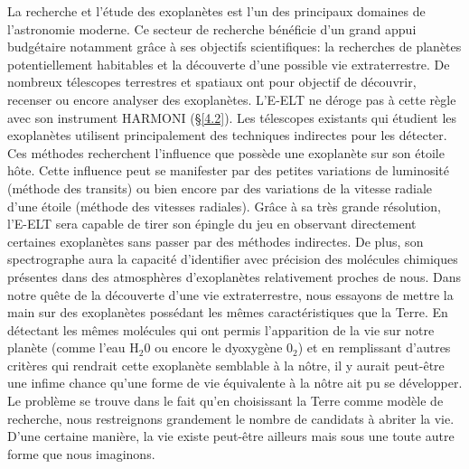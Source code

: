 La recherche et l'étude des exoplanètes est l'un des principaux domaines de l'astronomie moderne. Ce secteur de recherche bénéficie d'un grand appui budgétaire notamment grâce à ses objectifs scientifiques: la recherches de planètes potentiellement habitables et la découverte d'une possible vie extraterrestre. De nombreux télescopes terrestres et spatiaux ont pour objectif de découvrir, recenser ou encore analyser des exoplanètes. L'E-ELT ne déroge pas à cette règle avec son instrument HARMONI (§\ref{4.2}). Les télescopes existants qui étudient les exoplanètes utilisent principalement des techniques indirectes pour les détecter. Ces méthodes recherchent l'influence que possède une exoplanète sur son étoile hôte. Cette influence peut se manifester par des petites variations de luminosité (méthode des transits) ou bien encore par des variations de la vitesse radiale d'une étoile (méthode des vitesses radiales). Grâce à sa très grande résolution, l'E-ELT sera capable de tirer son épingle du jeu en observant directement certaines exoplanètes sans passer par des méthodes indirectes. De plus, son spectrographe aura la capacité d'identifier avec précision des molécules chimiques présentes dans des atmosphères d'exoplanètes relativement proches de nous. Dans notre quête de la découverte d'une vie extraterrestre, nous essayons de mettre la main sur des exoplanètes possédant les mêmes caractéristiques que la Terre. En détectant les mêmes molécules qui ont permis l'apparition de la vie sur notre planète (comme l'eau H$_{2} 0$ ou encore le dyoxygène $0_{2}$) et en remplissant d'autres critères qui rendrait cette exoplanète semblable à la nôtre, il y aurait peut-être une infime chance qu'une forme de vie équivalente à la nôtre ait pu se développer. Le problème se trouve dans le fait qu'en choisissant la Terre comme modèle de recherche, nous restreignons grandement le nombre de candidats à abriter la vie. D'une certaine manière, la vie existe peut-être ailleurs mais sous une toute autre forme que nous imaginons.










